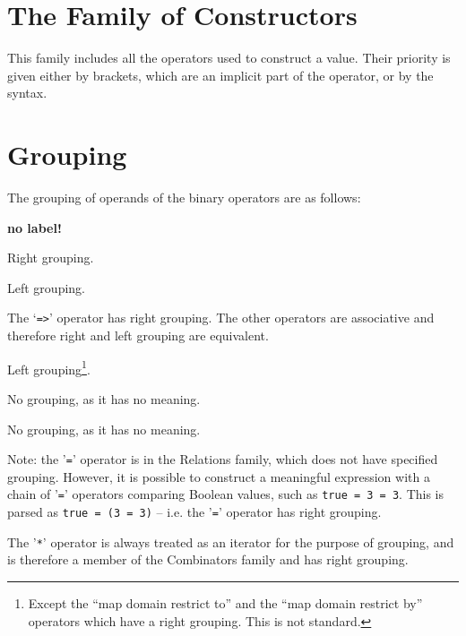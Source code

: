 \documentclass{overturerepchap}
\begin{document}
{\section{The Family of Constructors}

This family includes all the operators used to construct a value.  Their
priority is given either by brackets, which are an implicit part of the
operator, or by the syntax.

\section{Grouping}\label{grouping}

The grouping of operands of the binary operators are as follows:

\begin{list}{\bf no label!}{%
    \def\mylabel#1{\hspace\labelsep #1\hfill}
    \let\makelabel\mylabel
    \settowidth{\labelwidth}{Constructors: }
    \setlength{\leftmargin}{\labelwidth}
    \addtolength{\leftmargin}{2\labelsep}
    }
\item[Combinators:] Right grouping.

\item[Applicators:] Left grouping.

\item[Connectives:] The `{\tt =>}' operator has right grouping.  The other
  operators are associative and therefore right and left grouping are
  equivalent.

\item[Evaluators:] Left grouping\footnote{Except the ``map domain restrict
    to'' and the ``map domain restrict by'' operators which have a right
    grouping. This is not standard.}.

\item[Relations:] No grouping, as it has no meaning.

\item[Constructors:] No grouping, as it has no meaning.
\end{list}

Note: the '{\tt =}' operator is in the Relations family, which does not have specified grouping.
However, it is possible to construct a meaningful expression with a chain of '{\tt =}' operators comparing Boolean values, such as {\tt true = 3 = 3}. This is parsed as {\tt true = (3 = 3)} -- i.e. the '{\tt =}' operator has right grouping.

The '{\tt **}' operator is always treated as an iterator for the purpose of grouping, and is therefore a member of the Combinators family and has right grouping.

}
\end{document}
